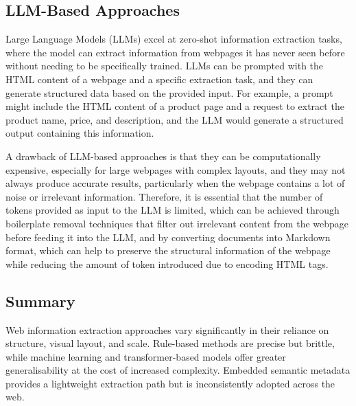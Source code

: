 \subsection{LLM-Based Approaches}\label{subsec:llm_based_approaches}
Large Language Models (LLMs) excel at zero-shot information extraction tasks, where the model can extract information from webpages it has never seen before without needing to be specifically trained.
LLMs can be prompted with the HTML content of a webpage and a specific extraction task, and they can generate structured data based on the provided input.
For example, a prompt might include the HTML content of a product page and a request to extract the product name, price, and description, and the LLM would generate a structured output containing this information.

A drawback of LLM-based approaches is that they can be computationally expensive, especially for large webpages with complex layouts, and they may not always produce accurate results, particularly when the webpage contains a lot of noise or irrelevant information.
Therefore, it is essential that the number of tokens provided as input to the LLM is limited, which can be achieved through boilerplate removal techniques that filter out irrelevant content from the webpage before feeding it into the LLM, and by converting documents into Markdown format, which can help to preserve the structural information of the webpage while reducing the amount of token introduced due to encoding HTML tags\cite{vinciguerra2026llm}.

\subsection{Summary}\label{subsec:web_info_extraction_summary}

Web information extraction approaches vary significantly in their reliance on structure, visual layout, and scale.
Rule-based methods are precise but brittle, while machine learning and transformer-based models offer greater generalisability at the cost of increased complexity.
Embedded semantic metadata provides a lightweight extraction path but is inconsistently adopted across the web.

